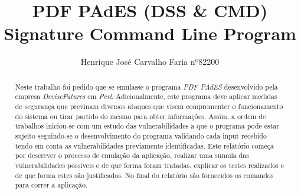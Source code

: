 %
\title{PDF PAdES (DSS \& CMD) Signature Command Line Program}
%
%
\author{ Henrique José Carvalho Faria nº82200 }
%
%
%
\maketitle              %
%
\begin{abstract}


Neste trabalho foi pedido que se emulasse o programa \textit{PDF PAdES} desenvolvido pela empresa \textit{DeviseFutures} em \textit{Perl}. Adicionalmente, este programa deve aplicar medidas de segurança que previnam diversos ataques que visem compromenter o funcionamento do sistema ou tirar partido do mesmo para obter informações. Assim, a ordem de trabalhos iniciou-se com um estudo das vulnerabilidades a que o programa pode estar sujeito seguindo-se o desenvolvimento do programa validando cada input recebido tendo em conta as vulnerabilidades previamente identificadas.\newline
Este relatório começa por descrever o processo de emulação da aplicação, realizar uma sumula das vulnerabilidades possíveis e de que forma foram tratadas, explicar os testes realizados e de que forma estes são justificados. No final do relatório são fornecidos os comandos para correr a aplicação.


\end{abstract}
%
%
